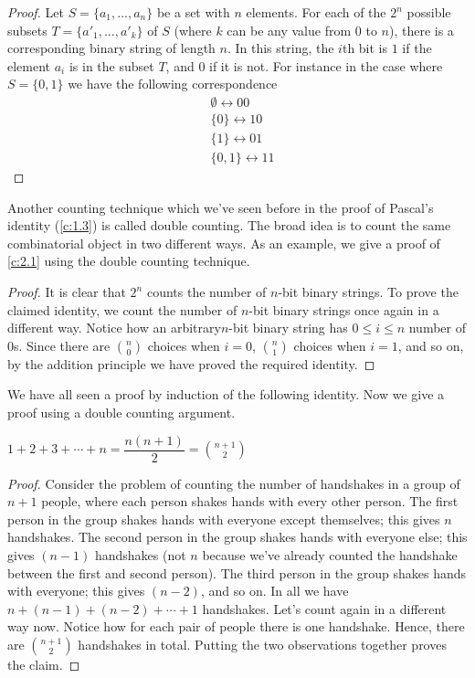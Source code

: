 \begin{proof}
	Let \( S = \{a_1, \ldots, a_n\} \) be a set with \( n \) elements. For each of the \( 2^n \) possible subsets \( T = \{a'_1, \ldots, a'_k\} \) of \( S \) (where \( k \) can be any value from 0 to \( n \)), there is a corresponding binary string of length \( n \). In this string, the \( i \)th bit is \( 1 \) if the element \( a_i \) is in the subset \( T \), and \( 0 \) if it is not. For instance in the case where $S=\{0,1\}$ we have the following correspondence
	 \begin{align*}
		&\emptyset \longleftrightarrow 00 \\
		&\{0\} \longleftrightarrow 10 \\
		&\{1\} \longleftrightarrow 01 \\
		&\{0,1\} \longleftrightarrow 11
	\end{align*}
\end{proof}
Another counting technique which we've seen before in the proof of Pascal's identity (\cref{c:1.3}) is called double counting. The broad idea is to count the same combinatorial object in two different ways. As an example, we give a proof of \cref{c:2.1} using the double counting technique.
\begin{proof}
It is clear that $2^n$ counts the number of $n$-bit binary strings. To prove the claimed identity, we count the number of $n$-bit binary strings once again in a different way. Notice how an arbitrary$n$-bit binary string has $0\leq i\leq n$ number of $0$s. Since there are $\binom{n}{0}$ choices when $i=0$, $\binom{n}{1}$ choices when $i=1$, and so on, by the addition principle we have proved the required identity.
\end{proof}

We have all seen a proof by induction of the following identity. Now we give a proof using a double counting argument.
\begin{claim}
	$1+2+3+\cdots+n=\dfrac{n\left( n+1 \right)}{2}=\binom{n+1}{2}$
	\label{c:2.2}
\end{claim}
\begin{proof}
	Consider the problem of counting the number of handshakes in a group of $n+1$ people, where each person shakes hands with every other person. The first person in the group shakes hands with everyone except themselves; this gives $n$ handshakes. The second person in the group shakes hands with everyone else; this gives $\left( n-1 \right)$ handshakes (not $n$ because we've already counted the handshake between the first and second person). The third person in the group shakes hands with everyone; this gives $\left( n-2 \right)$, and so on. In all we have $n+\left( n-1 \right)+\left( n-2 \right)+\cdots+1$ handshakes. Let's count again in a different way now. Notice how for each pair of people there is one handshake. Hence, there are $\binom{n+1}{2}$ handshakes in total. Putting the two observations together proves the claim.
\end{proof}

